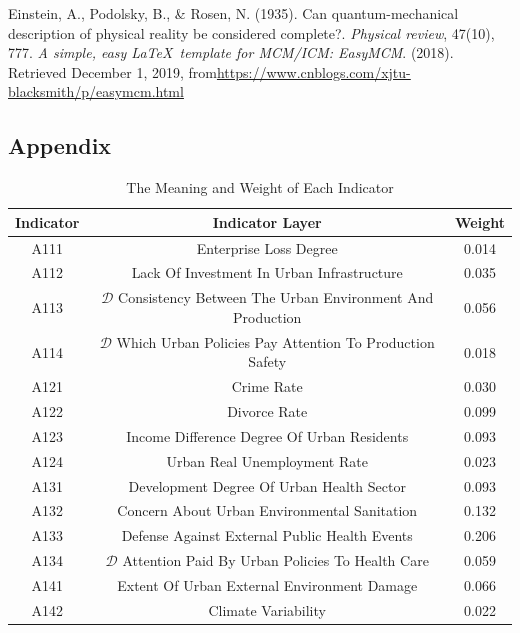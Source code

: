 \documentclass[12pt]{article}  %
\begin{document}
\begin{thebibliography}{99}
 Einstein, A., Podolsky, B., \& Rosen, N. (1935). Can quantum-mechanical description of physical reality be considered complete?. \emph{Physical review}, 47(10), 777.
 \emph{A simple, easy \LaTeX\ template for MCM/ICM: EasyMCM}. (2018). Retrieved December 1, 2019, from\url{https://www.cnblogs.com/xjtu-blacksmith/p/easymcm.html}
\end{thebibliography}


\begin{subappendices}  %
\section{Appendix}
\begin{table}[!ht]\small
    \centering
    \caption{The Meaning and Weight of Each Indicator}
    \begin{tabular}{ccc}
        \hline
        Indicator & Indicator Layer &Weight\\ \hline
        A111 & Enterprise Loss Degree &0.014 \\ 
        A112 & Lack Of Investment In Urban Infrastructure &0.035 \\ 
        A113 & $\mathcal{D}$ Consistency Between The Urban Environment And Production &0.056 \\ 
        A114 & $\mathcal{D}$ Which Urban Policies Pay Attention To Production Safety &0.018 \\ 
        A121 & Crime Rate &0.030 \\ 
        A122 & Divorce Rate &0.099 \\ 
        A123 & Income Difference Degree Of Urban Residents &0.093 \\ 
        A124 & Urban Real Unemployment Rate &0.023 \\ 
        A131 & Development Degree Of Urban Health Sector&0.093  \\ 
        A132 & Concern About Urban Environmental Sanitation  &0.132\\ 
        A133 & Defense Against External Public Health Events &0.206 \\ 
        A134 & $\mathcal{D}$ Attention Paid By Urban Policies To Health Care &0.059 \\ 
        A141 & Extent Of Urban External Environment Damage&0.066  \\ 
        A142 & Climate Variability &0.022 \\ 

\end{tabular}
\end{table}
\end{subappendices}
\end{document}
